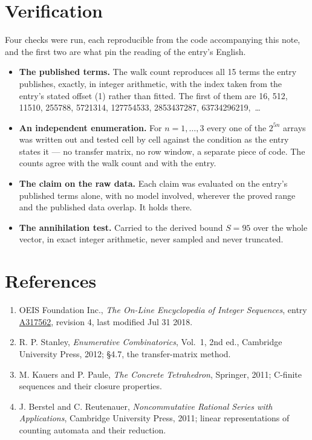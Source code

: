 \documentclass[11pt]{article}
\theoremstyle{definition}
\begin{document}
\section{Verification}

Four checks were run, each reproducible from the code accompanying this note, and the first two are what pin the reading of the entry's English.

\begin{itemize}

\item {\bfseries The published terms.} The walk count reproduces all 15 terms the entry publishes, exactly, in integer arithmetic, with the index taken from the entry's stated offset (1) rather than fitted. The first of them are 16, 512, 11510, 255788, 5721314, 127754533, 2853437287, 63734296219,~\dots

\item {\bfseries An independent enumeration.} For $n = 1,\dots,3$ every one of the $2^{5n}$ arrays was written out and tested cell by cell against the condition as the entry states it --- no transfer matrix, no row window, a separate piece of code. The counts agree with the walk count and with the entry.

\item {\bfseries The claim on the raw data.} Each claim was evaluated on the entry's published terms alone, with no model involved, wherever the proved range and the published data overlap. It holds there.

\item {\bfseries The annihilation test.} Carried to the derived bound $S = 95$ over the whole vector, in exact integer arithmetic, never sampled and never truncated.

\end{itemize}

\section{References}

\begin{enumerate}

\item OEIS Foundation Inc., \emph{The On-Line Encyclopedia of Integer Sequences}, entry \href{https://oeis.org/A317562}{A317562}, revision 4, last modified Jul 31 2018.

\item R. P. Stanley, \emph{Enumerative Combinatorics}, Vol.~1, 2nd ed., Cambridge University Press, 2012; \S4.7, the transfer-matrix method.

\item M. Kauers and P. Paule, \emph{The Concrete Tetrahedron}, Springer, 2011; C-finite sequences and their closure properties.

\item J. Berstel and C. Reutenauer, \emph{Noncommutative Rational Series with Applications}, Cambridge University Press, 2011; linear representations of counting automata and their reduction.

\end{enumerate}
\end{document}
